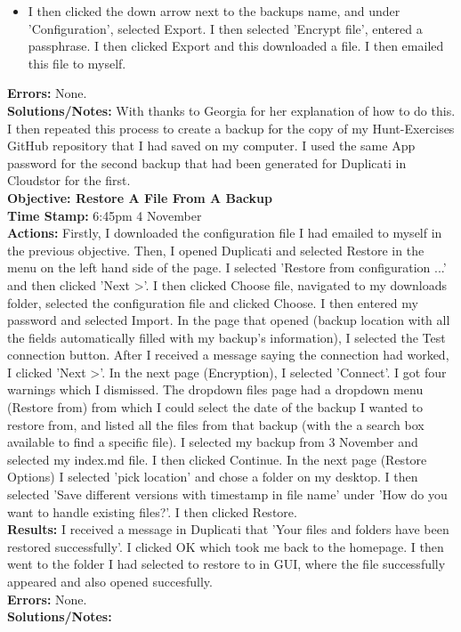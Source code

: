 \documentclass{article}
\begin{document}
\begin{FlushLeft}
\begin{itemize}
    \item I then clicked the down arrow next to the backups name, and under 'Configuration', selected Export. I then selected 'Encrypt file', entered a passphrase. I then clicked Export and this downloaded a file. I then emailed this file to myself.
\end{itemize}
\textbf{Errors:} None.\\
\textbf{Solutions/Notes:} With thanks to Georgia for her explanation of how to do this. I then repeated this process to create a backup for the copy of my Hunt-Exercises GitHub repository that I had saved on my computer. I used the same App password for the second backup that had been generated for Duplicati in Cloudstor for the first.\\
\vspace{5mm}
\textbf{Objective: Restore A File From A Backup}\\
\textbf{Time Stamp:} 6:45pm 4 November\\
\textbf{Actions:} Firstly, I downloaded the configuration file I had emailed to myself in the previous objective. Then, I opened Duplicati and selected Restore in the menu on the left hand side of the page. I selected 'Restore from configuration ...' and then clicked 'Next \textgreater'. I then clicked Choose file, navigated to my downloads folder, selected the configuration file and clicked Choose. I then entered my password and selected Import. In the page that opened (backup location with all the fields automatically filled with my backup's information), I selected the Test connection button. After I received a message saying the connection had worked, I clicked 'Next \textgreater'. In the next page (Encryption), I selected 'Connect'. I got four warnings which I dismissed. The dropdown files page had a dropdown menu (Restore from) from which I could select the date of the backup I wanted to restore from, and listed all the files from that backup (with the a search box available to find a specific file). I selected my backup from 3 November and selected my index.md file. I then clicked Continue. In the next page (Restore Options) I selected 'pick location' and chose a folder on my desktop. I then selected 'Save different versions with timestamp in file name' under 'How do you want to handle existing files?'. I then clicked Restore. \\
\textbf{Results:} I received a message in Duplicati that 'Your files and folders have been restored successfully'. I clicked OK which took me back to the homepage. I then went to the folder I had selected to restore to in GUI, where the file successfully appeared and also opened succesfully.\\
\textbf{Errors:} None.\\
\textbf{Solutions/Notes:}\\


\end{FlushLeft}
\end{document}
